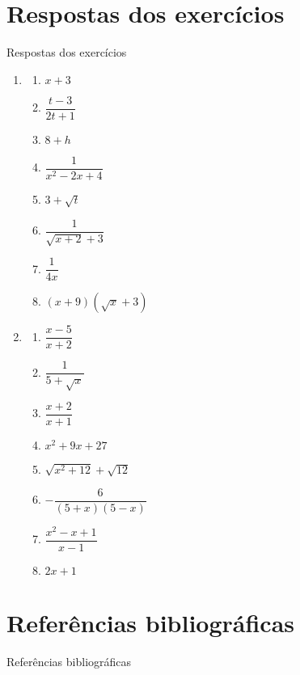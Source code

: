 \documentclass[14pt, aspectratio=169]{beamer}
\newcommand{\parenthesis}[1]{\left( #1 \right)}
\begin{document}
\section{Respostas dos exercícios}

\begin{frame}[allowframebreaks]{Respostas dos exercícios}

\begin{enumerate}
    \item 

    \begin{multicols}{2}
        \begin{enumerate}[a]
            \item $x + 3$
            \item $\dfrac{t - 3}{2t + 1}$
            \item $8 + h$
            \item $\dfrac{1}{x^2 - 2x + 4}$
            \item $3 +  \sqrt{t}$
            \item $\dfrac{1}{\sqrt{x+2} + 3}$
            \item $\dfrac{1}{4x}$
            \item $\parenthesis{x+9}\parenthesis{\sqrt{x}+3}$
            \end{enumerate}
    \end{multicols}
    

    \item 

    \begin{multicols}{2}
        \begin{enumerate}[a]
            \item $\dfrac{x-5}{x+2}$
            \item $\dfrac{1}{5 + \sqrt{x}}$
            \item $\dfrac{x+2}{x+1}$
            \item $x^2 + 9x + 27$
            \item $\sqrt{x^2 + 12} + \sqrt{12}$
            \item $-\dfrac{6}{\parenthesis{5+x}\parenthesis{5-x}}$
            \item $\dfrac{x^2-x+1}{x-1}$
            \item $2x+1$
            \end{enumerate}
    \end{multicols}
\end{enumerate}
    
\end{frame}

\section{Referências bibliográficas}

\begin{frame}{Referências bibliográficas}
    
\end{frame}
\end{document}
